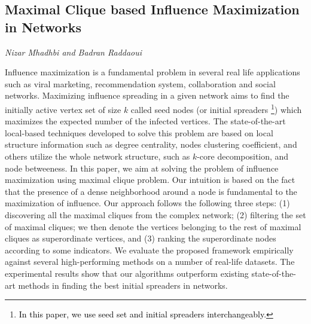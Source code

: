 \documentclass[../booklet.tex]{subfiles}
\begin{document}
\subsection[Maximal Clique based Influence Maximization in Networks. {\it Nizar Mhadhbi and Badran Raddaoui}]{Maximal Clique based Influence Maximization in Networks}
 

\begin{center}
  {\it Nizar Mhadhbi and Badran Raddaoui}
\end{center}

\vskip 0.8cm


Influence maximization is a fundamental problem in several real life applications such as viral marketing, recommendation system, collaboration and social networks.
Maximizing influence spreading in a given network  aims to find  the initially active vertex set of size $k$ called seed nodes (or initial spreaders \footnote{\textcolor{black}{In this paper, we use seed set and initial spreaders interchangeably.}})
which maximizes the expected number of the infected vertices.
The state-of-the-art local-based techniques developed to solve this problem are based  on  local  structure  information  such  as  degree  centrality, nodes clustering  coefficient, and  others  utilize the whole  network  structure, such  as $k$-core decomposition, and node betweeness.
In this paper, we aim at solving the problem of influence maximization using maximal clique problem.
Our intuition is based on the fact that the presence
of  a  dense  neighborhood  around  a  node  is  fundamental  to  the  maximization
of influence.
Our approach follows the following three steps: (1) discovering all the maximal cliques from the complex network; (2) filtering the set of maximal cliques; we then denote the vertices belonging to the rest of maximal cliques as superordinate vertices, and (3) ranking the superordinate nodes according to some indicators.
We evaluate the proposed framework empirically against several high-performing methods on a number of real-life datasets. The experimental results show that our algorithms outperform existing state-of-the-art
methods in finding the best initial spreaders  in networks.

\end{document}
